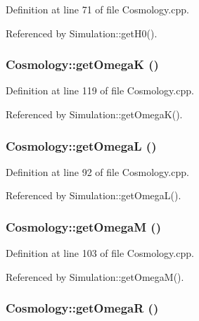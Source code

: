 Definition at line 71 of file Cosmology.cpp.



Referenced by Simulation::getH0().

\subsubsection[{getOmegaK}]{ Cosmology::getOmegaK ()}\label{classCosmology_a671dcd13edd6c792d0dd791021bc045f}


Definition at line 119 of file Cosmology.cpp.



Referenced by Simulation::getOmegaK().

\subsubsection[{getOmegaL}]{ Cosmology::getOmegaL ()}\label{classCosmology_aca57afe74a4f674d4006fc34d84e5477}


Definition at line 92 of file Cosmology.cpp.



Referenced by Simulation::getOmegaL().

\subsubsection[{getOmegaM}]{ Cosmology::getOmegaM ()}\label{classCosmology_a6ef569243dfcd76426f03b0fd0b3307d}


Definition at line 103 of file Cosmology.cpp.



Referenced by Simulation::getOmegaM().

\subsubsection[{getOmegaR}]{ Cosmology::getOmegaR ()}\label{classCosmology_a930f85ca62d601eb47989f09675077e8}


